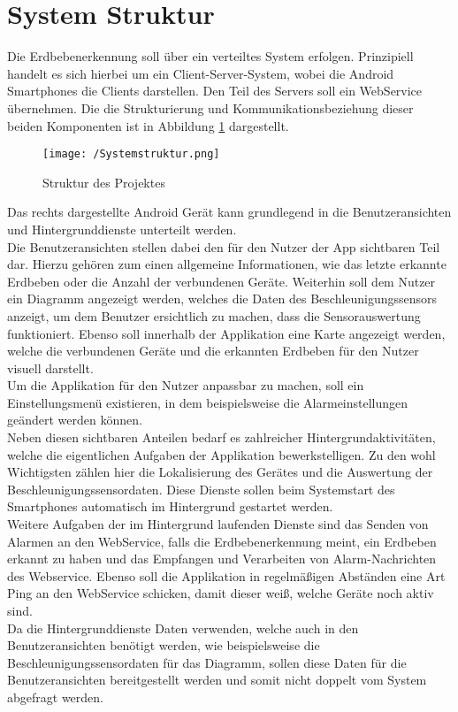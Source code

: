 \section{System Struktur}
Die Erdbebenerkennung soll über ein verteiltes System erfolgen. Prinzipiell handelt es sich hierbei um ein Client-Server-System, wobei die Android Smartphones die Clients darstellen. Den Teil des Servers soll ein WebService übernehmen. Die die Strukturierung und Kommunikationsbeziehung dieser beiden Komponenten ist in Abbildung \ref{fig:SystemStrukutr} dargestellt.
\begin{figure}[H]
\centering
\texttt{[image: /Systemstruktur.png]}
\caption{Struktur des Projektes}
\label{fig:SystemStrukutr}
\end{figure}
Das rechts dargestellte Android Gerät kann grundlegend in die Benutzeransichten und Hintergrunddienste unterteilt werden.\\
Die Benutzeransichten stellen dabei den für den Nutzer der App sichtbaren Teil dar. Hierzu gehören zum einen allgemeine Informationen, wie das letzte erkannte Erdbeben oder die Anzahl der verbundenen Geräte. Weiterhin soll dem Nutzer ein Diagramm angezeigt werden, welches die Daten des Beschleunigungssensors anzeigt, um dem Benutzer ersichtlich zu machen, dass die Sensorauswertung funktioniert. Ebenso soll innerhalb der Applikation eine Karte angezeigt werden, welche die verbundenen Geräte und die erkannten Erdbeben für den Nutzer visuell darstellt.\\
Um die Applikation für den Nutzer anpassbar zu machen, soll ein Einstellungsmenü existieren, in dem beispielsweise die Alarmeinstellungen geändert werden können.\\
Neben diesen sichtbaren Anteilen bedarf es zahlreicher Hintergrundaktivitäten, welche die eigentlichen Aufgaben der Applikation bewerkstelligen. Zu den wohl Wichtigsten zählen hier die Lokalisierung des Gerätes und die Auswertung der Beschleunigungssensordaten. Diese Dienste sollen beim Systemstart des Smartphones automatisch im Hintergrund gestartet werden.\\
Weitere Aufgaben der im Hintergrund laufenden Dienste sind das Senden von Alarmen an den WebService, falls die Erdbebenerkennung meint, ein Erdbeben erkannt zu haben und das Empfangen und Verarbeiten von Alarm-Nachrichten des Webservice. Ebenso soll die Applikation in regelmäßigen Abständen eine Art Ping an den WebService schicken, damit dieser weiß, welche Geräte noch aktiv sind.\\
Da die Hintergrunddienste Daten verwenden, welche auch in den Benutzeransichten benötigt werden, wie beispielsweise die Beschleunigungssensordaten für das Diagramm, sollen diese Daten für die Benutzeransichten bereitgestellt werden und somit nicht doppelt vom System abgefragt werden.\\
